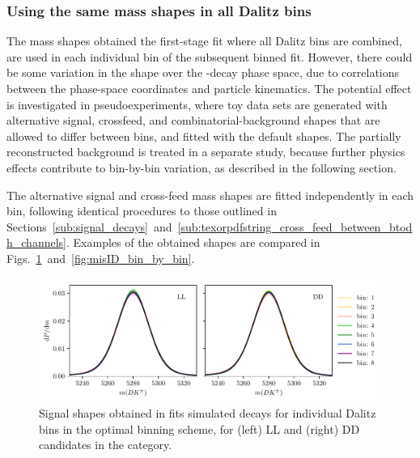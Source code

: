 
\subsubsection{Using the same mass shapes in all Dalitz bins} %
\label{ssub:using_the_same_signal_shape_in_all_dalitz_bins}

The mass shapes obtained the first-stage fit where all Dalitz bins are combined, are used in each individual bin of the subsequent binned fit. However, there could be some variation in the shape over the \D-decay phase space, due to correlations between the phase-space coordinates and particle kinematics. The potential effect is investigated in pseudoexperiments, where toy data sets are generated with alternative signal, crossfeed, and combinatorial-background shapes that are allowed to differ between bins, and fitted with the default shapes. The partially reconstructed background is treated in a separate study, because further physics effects contribute to bin-by-bin variation, as described in the following section. 

The alternative signal and cross-feed mass shapes are fitted independently in each bin, following identical procedures to those outlined in Sections~\ref{sub:signal_decays}~and~\ref{sub:texorpdfstring_cross_feed_between_btodh_channels}. Examples of the obtained shapes are compared in Figs.~\ref{fig:signal_bin_by_bin}~and~\ref{fig:misID_bin_by_bin}.

\begin{figure}[tp]
    \centering
    \includegraphics[width=0.85\columnwidth]{figures/analysis/systematics/signal_bin_by_bin.pdf}
    \caption{Signal shapes obtained in fits simulated \BtoDpi decays for individual Dalitz bins in the optimal binning scheme, for (left) LL and (right) DD candidates in the \BtoDpiDtoKspipi category. }
    \label{fig:signal_bin_by_bin}
\end{figure}

